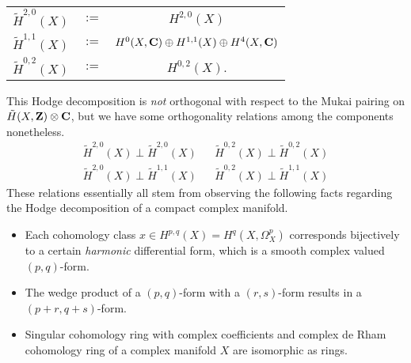 \begin{center}
    \begin{tabular}{r c c}
        $\widetilde{H}^{2,0}(X)$ & $:=$ & $H^{2,0}(X)$ \\
        $\widetilde{H}^{1,1}(X)$ & $:=$ & $H^{0}(X, \mathbf C) \oplus H^{1,1}(X) \oplus H^{4}(X, \mathbf C)$ \\
        $\widetilde{H}^{0,2}(X)$ & $:=$ & $H^{0,2}(X)$.
    \end{tabular}
\end{center}

\begin{remark}
    This Hodge decomposition is \emph{not} orthogonal with respect to the Mukai pairing on $\,\tilde{\!{H}}(X, \mathbf Z) \otimes \mathbf C$, but we have some orthogonality relations among the components nonetheless. 
    \begin{align}
        \widetilde{H}^{2,0}(X) \perp \widetilde{H}^{2,0}(X) & & \widetilde{H}^{0,2}(X) \perp \widetilde{H}^{0,2}(X) \label{eq: orthogonality relations 1}\\
        \widetilde{H}^{2,0}(X) \perp \widetilde{H}^{1,1}(X) & &\widetilde{H}^{0,2}(X) \perp \widetilde{H}^{1,1}(X) \label{eq: orthogonality relations 2}
    \end{align}
    These relations essentially all stem from observing the following facts regarding the Hodge decomposition of a compact complex manifold.
    \begin{itemize}[label = $\rhd$]
        \item{
            Each cohomology class $x \in H^{p,q}(X) = H^q(X, \Omega_X^p)$ corresponds bijectively to a certain \emph{harmonic} differential form, which is a smooth complex valued $(p,q)$-form.
        }
        \item{
            The wedge product of a $(p,q)$-form with a $(r,s)$-form results in a $(p+r, q+s)$-form.
        }
        \item{
            Singular cohomology ring with complex coefficients and complex de Rham cohomology ring of a complex manifold $X$ are isomorphic as rings.
        }
    \end{itemize}
\end{remark}


